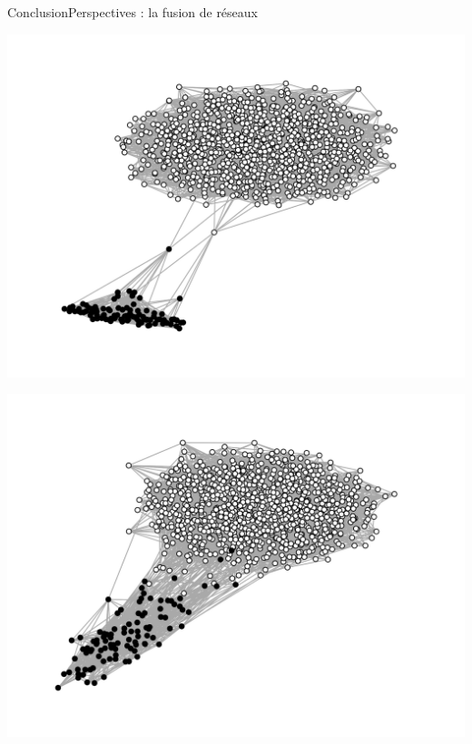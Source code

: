 \begin{frame}{Conclusion}{Perspectives : la fusion de réseaux}
  \begin{minipage}{0.325\textwidth}
    \includegraphics[width=1.2\textwidth]{img/graphA.png}
  \end{minipage}
  \begin{minipage}{0.325\textwidth}
    \includegraphics[width=1.2\textwidth]{img/graphB.png}
  \end{minipage}
  \begin{minipage}{0.325\textwidth}

\end{minipage}
\end{frame}

